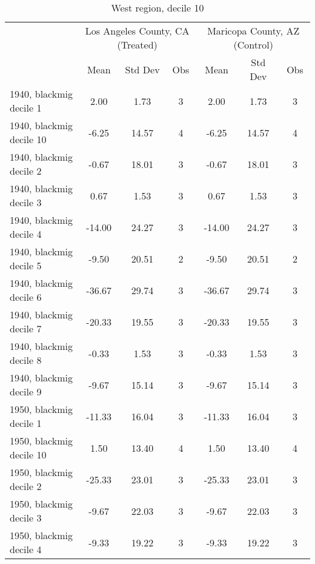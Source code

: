\begin{table}[htbp]\centering
\def\sym#1{\ifmmode^{#1}\else\(^{#1}\)\fi}
\caption{West region, decile 10 \label{tab1}}
\begin{tabular}{l*{2}{ccc}}
\toprule
                    &\multicolumn{3}{c}{Los Angeles County, CA (Treated)}&\multicolumn{3}{c}{Maricopa County, AZ (Control)}\\
                    &        Mean&     Std Dev&         Obs&        Mean&     Std Dev&         Obs\\
\midrule
1940, blackmig decile 1&        2.00&        1.73&           3&        2.00&        1.73&           3\\
1940, blackmig decile 10&       -6.25&       14.57&           4&       -6.25&       14.57&           4\\
1940, blackmig decile 2&       -0.67&       18.01&           3&       -0.67&       18.01&           3\\
1940, blackmig decile 3&        0.67&        1.53&           3&        0.67&        1.53&           3\\
1940, blackmig decile 4&      -14.00&       24.27&           3&      -14.00&       24.27&           3\\
1940, blackmig decile 5&       -9.50&       20.51&           2&       -9.50&       20.51&           2\\
1940, blackmig decile 6&      -36.67&       29.74&           3&      -36.67&       29.74&           3\\
1940, blackmig decile 7&      -20.33&       19.55&           3&      -20.33&       19.55&           3\\
1940, blackmig decile 8&       -0.33&        1.53&           3&       -0.33&        1.53&           3\\
1940, blackmig decile 9&       -9.67&       15.14&           3&       -9.67&       15.14&           3\\
1950, blackmig decile 1&      -11.33&       16.04&           3&      -11.33&       16.04&           3\\
1950, blackmig decile 10&        1.50&       13.40&           4&        1.50&       13.40&           4\\
1950, blackmig decile 2&      -25.33&       23.01&           3&      -25.33&       23.01&           3\\
1950, blackmig decile 3&       -9.67&       22.03&           3&       -9.67&       22.03&           3\\
1950, blackmig decile 4&       -9.33&       19.22&           3&       -9.33&       19.22&           3\\

\end{tabular}
\end{table}
